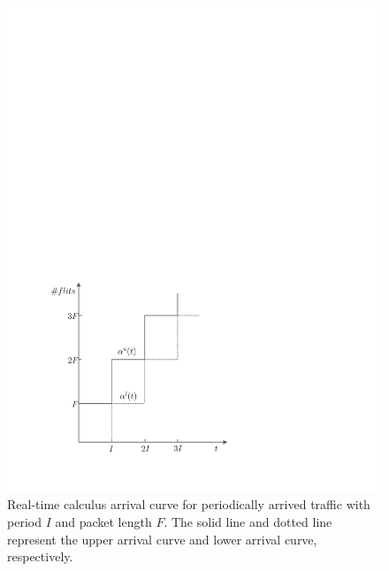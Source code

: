 \documentclass[10pt,journal]{IEEEtran}
\begin{document}
\begin{figure}
  \centering
  \includegraphics[scale=0.5]{figures/AC.pdf}
  \caption{Real-time calculus arrival curve for periodically arrived traffic with period $I$ and packet length $F$. The solid line and dotted line represent the upper arrival curve and lower arrival curve, respectively.}\label{ac}
\end{figure}
\end{document}
